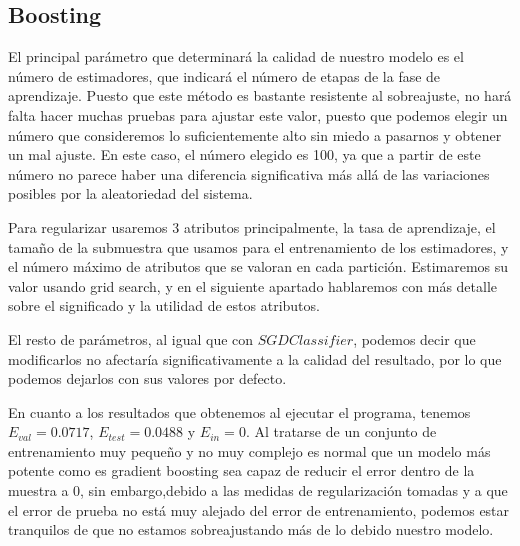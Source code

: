 \documentclass{article}
\begin{document}
	\subsection{Boosting}
	El principal parámetro que determinará la calidad de nuestro modelo es el número de estimadores, que indicará el número de etapas de la fase de aprendizaje. Puesto que este método es bastante resistente al sobreajuste, no hará falta hacer muchas pruebas para ajustar este valor, puesto que podemos elegir un número que consideremos lo suficientemente alto sin miedo a pasarnos y obtener un mal ajuste. En este caso, el número elegido es 100, ya que a partir de este número no parece haber una diferencia significativa más allá de las variaciones posibles por la aleatoriedad del sistema.
	\par 
	Para regularizar usaremos 3 atributos principalmente, la tasa de aprendizaje, el tamaño de la submuestra que usamos para el entrenamiento de los estimadores, y el número máximo de atributos que se valoran en cada partición. Estimaremos su valor usando grid search, y en el siguiente apartado hablaremos con más detalle sobre el significado y la utilidad de estos atributos.
	\par 
	El resto de parámetros, al igual que con $SGDClassifier$, podemos decir que modificarlos no afectaría significativamente a la calidad del resultado, por lo que podemos dejarlos con sus valores por defecto.
	\par 
	En cuanto a los resultados que obtenemos al ejecutar el programa, tenemos  $E_{val} = 0.0717$, $E_{test} = 0.0488$ y $E_{in} = 0$. Al tratarse de un conjunto de entrenamiento muy pequeño y no muy complejo es normal que un modelo más potente como es gradient boosting sea capaz de reducir el error dentro de la muestra a 0, sin embargo,debido a las medidas de regularización tomadas y a que el error de prueba no está muy alejado del error de entrenamiento, podemos estar tranquilos de que no estamos sobreajustando más de lo debido nuestro modelo.
	
\end{document}
